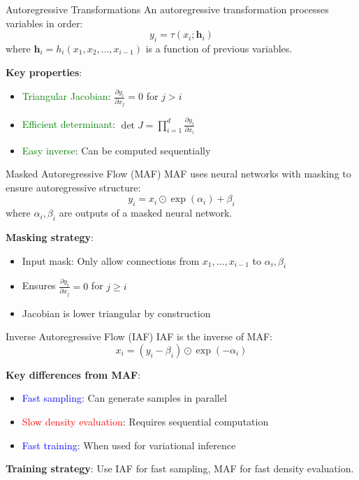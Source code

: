 \documentclass[aspectratio=169]{beamer}
\begin{document}
\begin{frame}{Autoregressive Transformations}
An autoregressive transformation processes variables in order:
\begin{equation}
    y_i = \tau(x_i; \mathbf{h}_i)
\end{equation}
where $\mathbf{h}_i = h_i(x_1, x_2, \ldots, x_{i-1})$ is a function of previous variables.

\textbf{Key properties}:
\begin{itemize}
    \item \textcolor{green}{Triangular Jacobian}: $\frac{\partial y_i}{\partial x_j} = 0$ for $j > i$
    \item \textcolor{green}{Efficient determinant}: $\det J = \prod_{i=1}^d \frac{\partial y_i}{\partial x_i}$
    \item \textcolor{green}{Easy inverse}: Can be computed sequentially
\end{itemize}
\end{frame}

\begin{frame}{Masked Autoregressive Flow (MAF)}
MAF uses neural networks with masking to ensure autoregressive structure:
\begin{equation}
    y_i = x_i \odot \exp(\alpha_i) + \beta_i
\end{equation}
where $\alpha_i, \beta_i$ are outputs of a masked neural network.

\textbf{Masking strategy}:
\begin{itemize}
    \item Input mask: Only allow connections from $x_1, \ldots, x_{i-1}$ to $\alpha_i, \beta_i$
    \item Ensures $\frac{\partial y_i}{\partial x_j} = 0$ for $j \geq i$
    \item Jacobian is lower triangular by construction
\end{itemize}
\end{frame}


\begin{frame}{Inverse Autoregressive Flow (IAF)}
IAF is the inverse of MAF:
\begin{equation}
    x_i = (y_i - \beta_i) \odot \exp(-\alpha_i)
\end{equation}

\textbf{Key differences from MAF}:
\begin{itemize}
    \item \textcolor{blue}{Fast sampling}: Can generate samples in parallel
    \item \textcolor{red}{Slow density evaluation}: Requires sequential computation
    \item \textcolor{blue}{Fast training}: When used for variational inference
\end{itemize}

\textbf{Training strategy}: Use IAF for fast sampling, MAF for fast density evaluation.
\end{frame}
\end{document}
